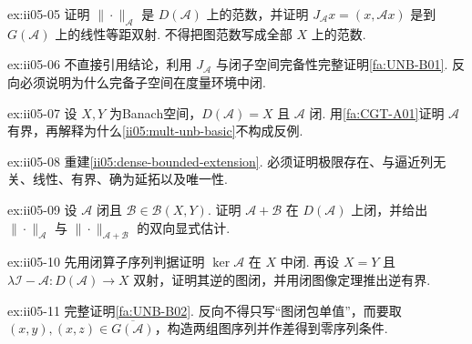 \begin{FAExercise}[图范数与等距图嵌入]{ex:ii05-05}
证明 \(\displaystyle\|\cdot\|_{\mathcal A}\) 是 \(\displaystyle D(\mathcal A)\) 上的范数，并证明 \(\displaystyle J_{\mathcal A}x=(x,\mathcal Ax)\) 是到 \(\displaystyle G(\mathcal A)\) 上的线性等距双射. 不得把图范数写成全部 \(\displaystyle X\) 上的范数.
\end{FAExercise}

\begin{FAExercise}[闭性与图范数完备性的两个方向]{ex:ii05-06}
不直接引用结论，利用 \(\displaystyle J_{\mathcal A}\) 与闭子空间完备性完整证明\autoref{fa:UNB-B01}. 反向必须说明为什么完备子空间在度量环境中闭.
\end{FAExercise}

\begin{FAExercise}[闭图像定理的定义域边界]{ex:ii05-07}
设 \(\displaystyle X,Y\) 为Banach空间，\(\displaystyle D(\mathcal A)=X\) 且 \(\displaystyle\mathcal A\) 闭. 用\autoref{fa:CGT-A01}证明 \(\displaystyle\mathcal A\) 有界，再解释为什么\autoref{ii05:mult-unb-basic}不构成反例.
\end{FAExercise}

\begin{FAExercise}[稠密定义上的有界延拓]{ex:ii05-08}
重建\autoref{ii05:dense-bounded-extension}. 必须证明极限存在、与逼近列无关、线性、有界、确为延拓以及唯一性.
\end{FAExercise}

\begin{FAExercise}[有界扰动与图范数等价]{ex:ii05-09}
设 \(\displaystyle\mathcal A\) 闭且 \(\displaystyle\mathcal B\in\mathcal B(X,Y)\). 证明 \(\displaystyle\mathcal A+\mathcal B\) 在 \(\displaystyle D(\mathcal A)\) 上闭，并给出 \(\displaystyle\|\cdot\|_{\mathcal A}\) 与 \(\displaystyle\|\cdot\|_{\mathcal A+\mathcal B}\) 的双向显式估计.
\end{FAExercise}

\begin{FAExercise}[核的闭性与预解逆]{ex:ii05-10}
先用闭算子序列判据证明 \(\displaystyle\ker\mathcal A\) 在 \(\displaystyle X\) 中闭. 再设 \(\displaystyle X=Y\) 且 \(\displaystyle\lambda\mathcal I-\mathcal A:D(\mathcal A)\to X\) 双射，证明其逆的图闭，并用闭图像定理推出逆有界.
\end{FAExercise}

\begin{FAExercise}[可闭性的零序列判据]{ex:ii05-11}
完整证明\autoref{fa:UNB-B02}. 反向不得只写“图闭包单值”，而要取 \(\displaystyle(x,y),(x,z)\in\overline{G(\mathcal A)}\)，构造两组图序列并作差得到零序列条件.
\end{FAExercise}

